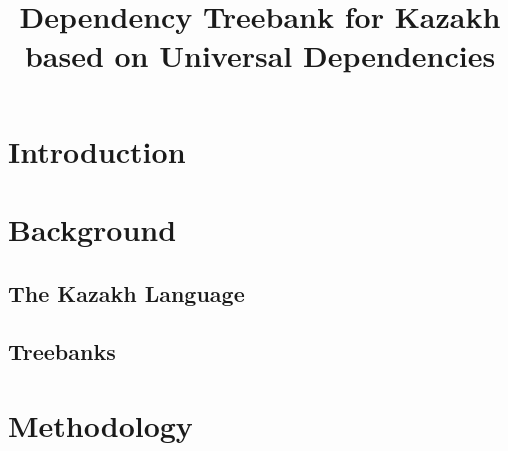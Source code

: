 \documentclass[a4paper,11pt,twocolumn]{article}
\title{Dependency Treebank for Kazakh based on Universal Dependencies}
\begin{document}
\maketitleabstract{}


\section{Introduction}

\section{Background}

\subsection{The Kazakh Language}

\subsection{Treebanks}

\section{Methodology}
\end{document}
